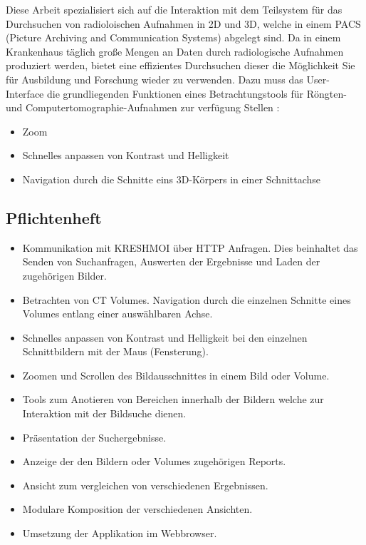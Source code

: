 Diese Arbeit spezialisiert sich auf die Interaktion mit dem Teilsystem für das Durchsuchen von radioloischen Aufnahmen in 2D und 3D,
welche in einem PACS (Picture Archiving and Communication Systems) abgelegt sind.
Da in einem Krankenhaus täglich große Mengen an Daten durch radiologische Aufnahmen produziert werden, 
bietet eine effizientes Durchsuchen dieser die Möglichkeit Sie  für Ausbildung und Forschung wieder zu verwenden.
%
Dazu muss das User-Interface die grundliegenden Funktionen eines Betrachtungstools für Röngten- und Computertomographie-Aufnahmen zur verfügung Stellen :
\begin{itemize}
	\item Zoom
	\item Schnelles anpassen von Kontrast und Helligkeit
	\item Navigation durch die Schnitte eins 3D-Körpers in einer Schnittachse
\end{itemize}
\cite{pacs}


\subsection{Pflichtenheft}
\label{sec:Pflichtenheft}
\begin{itemize}
	\item Kommunikation mit KRESHMOI über HTTP Anfragen. Dies beinhaltet das Senden von Suchanfragen, Auswerten der Ergebnisse und Laden der zugehörigen Bilder.
	\item Betrachten von CT Volumes. Navigation durch die einzelnen Schnitte eines Volumes entlang einer auswählbaren Achse.
	\item Schnelles anpassen von Kontrast und Helligkeit bei den einzelnen Schnittbildern mit der Maus (Fensterung).
	\item Zoomen und Scrollen des Bildausschnittes in einem Bild oder Volume.
	\item Tools zum Anotieren von Bereichen innerhalb der Bildern welche zur Interaktion mit der Bildsuche dienen.
	\item Präsentation der Suchergebnisse.
	\item Anzeige der den Bildern oder Volumes zugehörigen Reports.
	\item Ansicht zum vergleichen von verschiedenen Ergebnissen.
	\item Modulare Komposition der verschiedenen Ansichten.
	\item Umsetzung der Applikation im Webbrowser.
\end{itemize}

